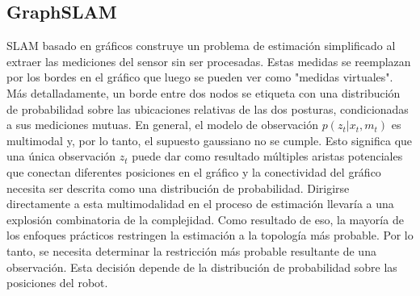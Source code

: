\subsection{GraphSLAM}
SLAM basado en gr\'aficos construye un problema de estimaci\'on 
simplificado al extraer las mediciones del sensor sin ser 
procesadas. Estas medidas se reemplazan por los bordes en el gr\'afico 
que luego se pueden ver como "medidas virtuales". M\'as detalladamente, 
un borde entre dos nodos se etiqueta con una distribuci\'on de 
probabilidad sobre las ubicaciones relativas de las dos posturas, 
condicionadas a sus mediciones mutuas. En general, el modelo de observaci\'on 
$p(z_{t}| x_{t},  m_{t})$ es multimodal y, por lo tanto, el supuesto 
gaussiano no se cumple. Esto significa que una \'unica observaci\'on 
$z_{t}$ puede dar como resultado m\'ultiples aristas potenciales que 
conectan diferentes posiciones en el gr\'afico y la conectividad del 
gr\'afico necesita ser descrita como una distribuci\'on de probabilidad. 
Dirigirse directamente a esta multimodalidad en el proceso de estimaci\'on 
llevar\'ia a una explosi\'on combinatoria de la complejidad. Como resultado 
de eso, la mayor\'ia de los enfoques pr\'acticos restringen la 
estimaci\'on a la topolog\'ia m\'as probable. Por lo tanto, se 
necesita determinar la restricci\'on m\'as probable resultante de 
una observaci\'on. Esta decisi\'on depende de la distribuci\'on de 
probabilidad sobre las posiciones del robot.



